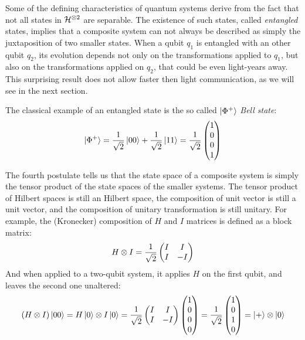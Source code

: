 Some of the defining characteristics of quantum systems derive from the fact that not all states in $\mathcal{H}^{\otimes 2}$ are separable. The existence of such states, called \textit{entangled} states, implies that a composite system can not always be described as simply the juxtaposition of two smaller states. When a qubit $q_1$ is entangled with an other qubit $q_2$, its evolution depends not only on the transformations applied to $q_1$, but also on the transformations applied on $q_2$, that could be even light-years away. This surprising result does not allow faster then light communication, as we will see in the next section.

The classical example of an entangled state is the so called $\ket{\Phi^+}$ \textit{Bell state}:
\[\ket{\Phi^+} = \frac{1}{\sqrt{2}}\ket{00} + \frac{1}{\sqrt{2}}\ket{11} = \frac{1}{\sqrt{2}}\begin{pmatrix}
1 \\ 0 \\ 0\\ 1
\end{pmatrix}
\]

The fourth postulate tells us that the state space of a composite system is simply the tensor product of the state spaces of the smaller systems. The tensor product of Hilbert spaces is still an Hilbert space, the composition of unit vector is still a unit vector, and the composition of unitary transformation is still unitary. For example, the (Kronecker) composition of $H$ and $I$ matrices is defined as a block matrix:
\[	H\otimes I = \frac{1}{\sqrt{2}}\begin{pmatrix}
	I & I \\ I & -I
	\end{pmatrix}\]
And when applied to a two-qubit system, it applies $H$ on the first qubit, and leaves the second one unaltered:
\[ (H\otimes I) \ket{00} = H\ket{0} \otimes I\ket{0} = \frac{1}{\sqrt{2}} \begin{pmatrix}
	I & I \\ I & -I
	\end{pmatrix} \begin{pmatrix}
	1 \\ 0 \\0 \\0
	\end{pmatrix} = \frac{1}{\sqrt{2}} \begin{pmatrix}
	1 \\ 0 \\ 1 \\ 0
	\end{pmatrix} = \ket{+}\otimes\ket{0}
\]

